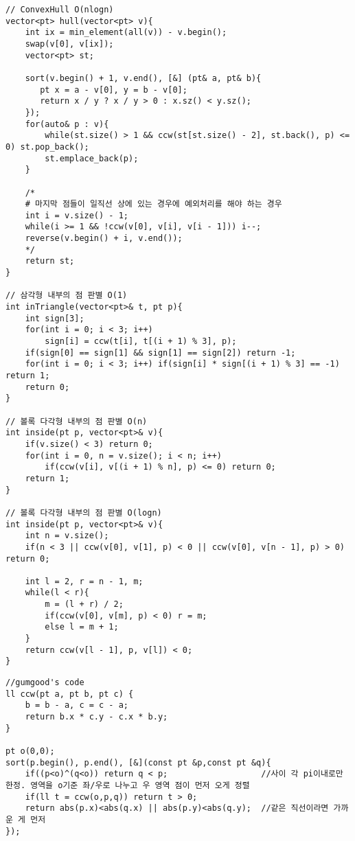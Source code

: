 \documentclass[landscape, 8pt, a4paper, oneside, twocolumn]{extarticle}
\begin{document}
\begin{verbatim}
// ConvexHull O(nlogn)
vector<pt> hull(vector<pt> v){
    int ix = min_element(all(v)) - v.begin();
    swap(v[0], v[ix]);
    vector<pt> st;
    
    sort(v.begin() + 1, v.end(), [&] (pt& a, pt& b){
       pt x = a - v[0], y = b - v[0];
       return x / y ? x / y > 0 : x.sz() < y.sz();
    });
    for(auto& p : v){
        while(st.size() > 1 && ccw(st[st.size() - 2], st.back(), p) <= 0) st.pop_back();
        st.emplace_back(p);
    }
    
    /*
    # 마지막 점들이 일직선 상에 있는 경우에 예외처리를 해야 하는 경우
    int i = v.size() - 1;
    while(i >= 1 && !ccw(v[0], v[i], v[i - 1])) i--;
    reverse(v.begin() + i, v.end());
    */
    return st;
}

// 삼각형 내부의 점 판별 O(1)
int inTriangle(vector<pt>& t, pt p){
    int sign[3];
    for(int i = 0; i < 3; i++)
        sign[i] = ccw(t[i], t[(i + 1) % 3], p);
    if(sign[0] == sign[1] && sign[1] == sign[2]) return -1;
    for(int i = 0; i < 3; i++) if(sign[i] * sign[(i + 1) % 3] == -1) return 1;
    return 0;
}

// 볼록 다각형 내부의 점 판별 O(n)
int inside(pt p, vector<pt>& v){
    if(v.size() < 3) return 0;
    for(int i = 0, n = v.size(); i < n; i++)
        if(ccw(v[i], v[(i + 1) % n], p) <= 0) return 0;
    return 1;
}

// 볼록 다각형 내부의 점 판별 O(logn)
int inside(pt p, vector<pt>& v){
    int n = v.size();
    if(n < 3 || ccw(v[0], v[1], p) < 0 || ccw(v[0], v[n - 1], p) > 0) return 0;
    
    int l = 2, r = n - 1, m;
    while(l < r){
        m = (l + r) / 2;
        if(ccw(v[0], v[m], p) < 0) r = m;
        else l = m + 1;
    }
    return ccw(v[l - 1], p, v[l]) < 0;
}
\end{verbatim}
\newpage
\begin{verbatim}
//gumgood's code
ll ccw(pt a, pt b, pt c) {
    b = b - a, c = c - a;
    return b.x * c.y - c.x * b.y;
}

pt o(0,0);
sort(p.begin(), p.end(), [&](const pt &p,const pt &q){
    if((p<o)^(q<o)) return q < p;                   //사이 각 pi이내로만 한정. 영역을 o기준 좌/우로 나누고 우 영역 점이 먼저 오게 정렬
    if(ll t = ccw(o,p,q)) return t > 0;          
    return abs(p.x)<abs(q.x) || abs(p.y)<abs(q.y);  //같은 직선이라면 가까운 게 먼저
});
\end{verbatim}
\end{document}
